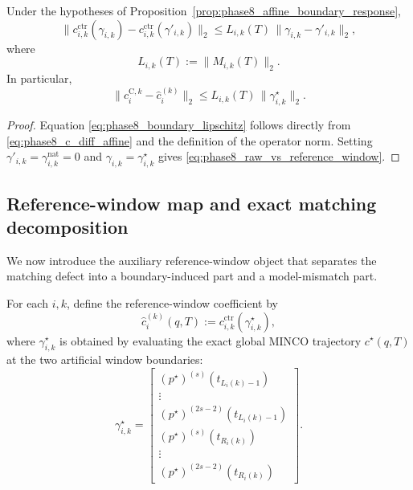 \begin{corollary}
\label{cor:phase8_boundary_lipschitz}
Under the hypotheses of Proposition~\ref{prop:phase8_affine_boundary_response},
\begin{equation}
\label{eq:phase8_boundary_lipschitz}
\bigl\|
c_{i,k}^{\mathrm{ctr}}(\gamma_{i,k})
-
c_{i,k}^{\mathrm{ctr}}(\gamma'_{i,k})
\bigr\|_2
\le
L_{i,k}(T)\,\|\gamma_{i,k}-\gamma'_{i,k}\|_2,
\end{equation}
where
\[
L_{i,k}(T):=\|M_{i,k}(T)\|_2.
\]
In particular,
\begin{equation}
\label{eq:phase8_raw_vs_reference_window}
\|c_i^{\mathrm{C},k}-\hat c_i^{(k)}\|_2
\le
L_{i,k}(T)\,\|\gamma_{i,k}^{\star}\|_2.
\end{equation}
\end{corollary}

\begin{proof}
Equation \eqref{eq:phase8_boundary_lipschitz} follows directly from
\eqref{eq:phase8_c_diff_affine} and the definition of the operator norm.
Setting \(\gamma'_{i,k}=\gamma_{i,k}^{\mathrm{nat}}=0\) and \(\gamma_{i,k}=\gamma_{i,k}^{\star}\) gives \eqref{eq:phase8_raw_vs_reference_window}.
\end{proof}

\subsection{Reference-window map and exact matching decomposition}
\label{subsec:phase8_reference_window_decomposition}

We now introduce the auxiliary reference-window object that separates the matching defect into a boundary-induced part and a model-mismatch part.

\begin{definition}
\label{def:phase8_reference_window}
For each \(i,k\), define the reference-window coefficient by
\begin{equation}
\label{eq:phase8_reference_window}
\hat c_i^{(k)}(q,T)
:=
c_{i,k}^{\mathrm{ctr}}(\gamma_{i,k}^{\star}),
\end{equation}
where \(\gamma_{i,k}^{\star}\) is obtained by evaluating the exact global MINCO trajectory \(c^\star(q,T)\) at the two artificial window boundaries:
\[
\gamma_{i,k}^{\star}
=
\begin{bmatrix}
(p^\star)^{(s)}(t_{L_i(k)-1})\\
\vdots\\
(p^\star)^{(2s-2)}(t_{L_i(k)-1})\\
(p^\star)^{(s)}(t_{R_i(k)})\\
\vdots\\
(p^\star)^{(2s-2)}(t_{R_i(k)})
\end{bmatrix}.
\]
\end{definition}

